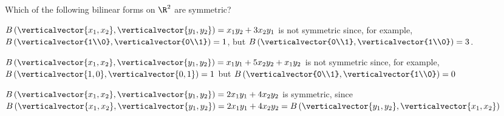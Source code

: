 \documentclass{ximera}
\begin{document}
\begin{question}
	Which of the following bilinear forms on $\R^2$ are symmetric?
		\begin{solution}
			\begin{hint}
				$B\left(\verticalvector{x_1,x_2},\verticalvector{y_1,y_2}\right) = x_1y_2+3x_2y_1$ is not symmetric since, for example,
				$B\left( \verticalvector{1\\0},\verticalvector{0\\1}\right) = 1$, but $B\left( \verticalvector{0\\1},\verticalvector{1\\0}\right) = 3$.
			\end{hint}
			\begin{hint}
				$B\left(\verticalvector{x_1,x_2},\verticalvector{y_1,y_2}\right) = x_1y_1+5x_2y_2+x_1y_2$ is not symmetric since, for example,
				$B\left(\verticalvector{1,0},\verticalvector{0,1}\right) = 1$ but  $B\left( \verticalvector{0\\1},\verticalvector{1\\0}\right) = 0$
			\end{hint}
			\begin{hint}
				$B\left(\verticalvector{x_1,x_2},\verticalvector{y_1,y_2}\right) = 2x_1y_1+4x_2y_2$ is symmetric, since
				$B\left(\verticalvector{x_1,x_2},\verticalvector{y_1,y_2}\right) = 2x_1y_1+4x_2y_2 = B\left(\verticalvector{y_1,y_2}, \verticalvector{x_1,x_2}\right) $
			\end{hint}
			\begin{multiple-choice}
			\end{multiple-choice}
		\end{solution}
\end{question}

\end{document}
